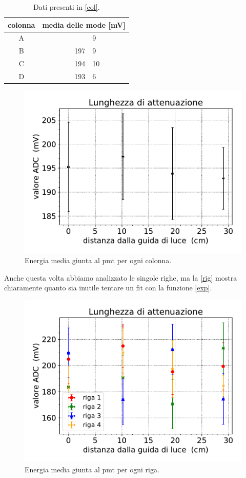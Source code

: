 \begin{table}[h]
\centering
\begin{tabular}{| c | r @{$\pm$} l |}
\hline
colonna & \multicolumn{2}{c|}{media delle mode [mV]} \\
\hline
A & \qquad \quad 195&9 \\
B & 197&9 \\
C & 194&10 \\
D & 193&6 \\
\hline
\end{tabular}
\caption{Dati presenti in \autoref{col}.}
\label{tab:ADC}
\end {table}

\begin{figure}[h]
\centering
\includegraphics[width=8 cm]{ecol}
\caption{Energia media giunta al pmt per ogni colonna.}
\label{col}
\end{figure}


Anche questa volta abbiamo analizzato le singole righe, ma la \autoref{rig} mostra chiaramente quanto sia inutile tentare un fit con la funzione \eqref{exp}. 

\begin{figure}[h]
\centering
\includegraphics[width=8 cm]{erig}
\caption{Energia media giunta al pmt per ogni riga.}
\label{rig}
\end{figure}


